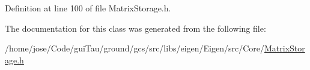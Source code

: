 Definition at line 100 of file Matrix\-Storage.\-h.



The documentation for this class was generated from the following file\-:\begin{DoxyCompactItemize}
\item 
/home/jose/\-Code/gui\-Tau/ground/gcs/src/libs/eigen/\-Eigen/src/\-Core/\hyperlink{_matrix_storage_8h}{Matrix\-Storage.\-h}\end{DoxyCompactItemize}
